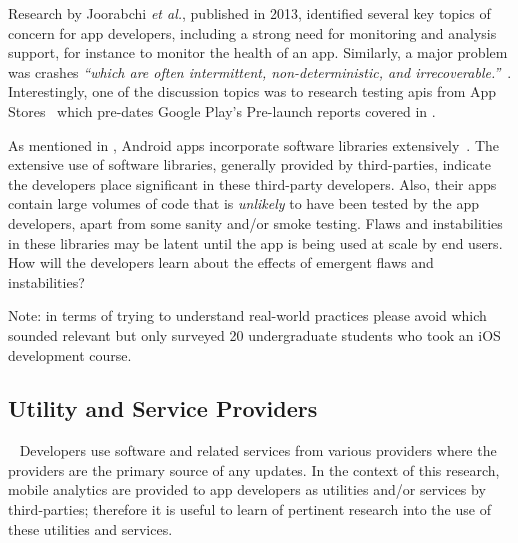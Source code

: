 Research by Joorabchi \emph{et al.}, published in 2013, identified several key topics of concern for app developers, including a strong need for monitoring and analysis support, for instance to monitor the health of an app. Similarly, a major problem was crashes \emph{``which are often intermittent, non-deterministic, and irrecoverable.''}~. Interestingly, one of the discussion topics was to research testing \acrshort{api}s from App Stores~ which pre-dates Google Play's Pre-launch reports covered in .


As mentioned in , Android apps incorporate software libraries extensively~. The extensive use of software libraries, generally provided by third-parties, indicate the developers place significant  in these third-party developers. Also, their apps contain large volumes of code that is \emph{unlikely} to have been tested by the app developers, apart from some sanity and/or smoke testing. Flaws and instabilities in these libraries may be latent until the app is being used at scale by end users. How will the developers learn about the effects of emergent flaws and instabilities?

Note: in terms of trying to understand real-world practices please avoid  which sounded relevant but only surveyed 20 undergraduate students who took an iOS development course. 



\subsection{Utility and Service Providers}~\label{rw-utility-and-service-providers-topic}
Developers use software and related services from various providers where the providers are the primary source of any updates. %
%
In the context of this research, mobile analytics are provided to app developers as utilities and/or services by third-parties; therefore it is useful to learn of pertinent research into the use of these utilities and services. %


